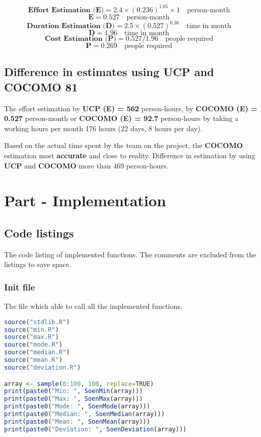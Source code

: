 \documentclass[12pt]{article}
\begin{document}
\begin{equation}
    \textbf{Effort Estimation (E)} = 2.4\times (0.236)^{1.05}\times 1 \quad \textrm{person-month} \quad
\end{equation}
\begin{equation}
    \textbf{E} = 0.527 \quad \textrm{person-month} \quad
\end{equation}
\begin{equation}
    \textbf{Duration Estimation (D)} = 2.5\times (0.527)^{0.38} \quad \textrm{time in month} \quad
\end{equation}
\begin{equation}
    \textbf{D} = 1.96 \quad \textrm{time in month} \quad
\end{equation}
\begin{equation}
    \textbf{Cost Estimation (P)} = 0.527/1.96 \quad \textrm{people required} \quad
\end{equation}
\begin{equation}
    \textbf{P} = 0.269 \quad \textrm{people required} \quad
\end{equation}

\subsection{Difference in estimates using UCP and COCOMO 81}
The effort estimation by \textbf{UCP (E) = 562} person-hours, by \textbf{COCOMO (E) = 0.527} person-month or \textbf{COCOMO (E) = 92.7} person-hours by taking a working hours per month 176 hours (22 days, 8 hours per day).

Based on the actual time spent by the team on the project, the \textbf{COCOMO} estimation most \textbf{accurate} and close to reality. Difference in estimation by using \textbf{UCP} and \textbf{COCOMO} more than 469 person-hours.
\newpage
\section{Part - Implementation}
\subsection{Code listings}
The code listing of implemented functions. The comments are excluded from the listings to save space. 
\subsubsection{Init file}
The file which able to call all the implemented functions.
\begin{lstlisting}[language=R]
source("stdlib.R")
source("min.R")
source("max.R")
source("mode.R")
source("median.R")
source("mean.R")
source("deviation.R")

array <- sample(0:100, 100, replace=TRUE)
print(paste0("Min: ", SoenMin(array)))
print(paste0("Max: ", SoenMax(array)))
print(paste0("Mode: ", SoenMode(array)))
print(paste0("Median: ", SoenMedian(array)))
print(paste0("Mean: ", SoenMean(array)))
print(paste0("Deviation: ", SoenDeviation(array)))
\end{lstlisting}
\end{document}
